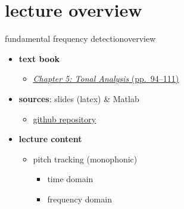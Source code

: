 

\subtitle{Part 6.2: Monophonic Fundamental Frequency Detection}


	

    \section[overview]{lecture overview}
        \begin{frame}{fundamental frequency detection}{overview}
            \begin{itemize}
                \item   \textbf{text book}  
                    \begin{itemize}
                        \item   \href{http://ieeexplore.ieee.org/xpl/articleDetails.jsp?tp=&arnumber=6331122&}{\underline{\textit{Chapter 5: Tonal Analysis} (pp.~94--111)}}
                    \end{itemize}
                \item   \textbf{sources}: slides (latex) \& Matlab  
                    \begin{itemize}
                        \item   \href{https://github.com/alexanderlerch/ACA-Slides}{\underline{github repository}}
                    \end{itemize}
                \bigskip
                \item<2->   \textbf{lecture content}
                    \begin{itemize}
                        \item<2->   pitch tracking (monophonic)
                            \begin{itemize}
                                \item   time domain
                                \item   frequency domain
                            \end{itemize}
                    \end{itemize}
            \end{itemize}
        \end{frame}

